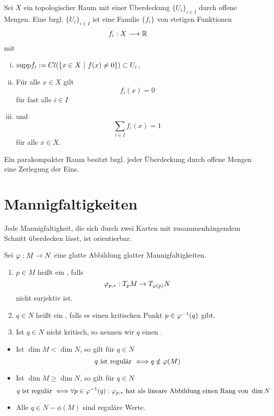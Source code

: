 \Def{}
Sei $X$ ein topologischer Raum mit einer Überdeckung $\{U_i\}_{i\in I}$ durch offene Mengen. Eine  bzgl. $\{U_i\}_{i\in I}$ ist eine Familie $\{f_i\}_{}$ von stetigen Funktionen
\begin{align*}
f_i : X & \overset{}{\longrightarrow} \mathbb{R}
\end{align*}
mit
\begin{enumerate}[i.)]
	\item $\supp f_i := Cl(\set{x\in X}{f(x) \neq 0}) \subset U_i$,
	\item Für alle $x \in X$ gilt
	\[ f_i(x) = 0 \]
	für fast alle $i \in I$
	\item und
	\[\sum_{i\in I}f_i(x) = 1\]
	für alle $x \in X$.
\end{enumerate}

\Satz{}
Ein parakompakter Raum besitzt bzgl. jeder Überdeckung durch offene Mengen eine Zerlegung der Eins.

\section{Mannigfaltigkeiten}
Jede Mannigfaltigkeit, die sich durch zwei Karten mit zusammenhängendem Schnitt überdecken lässt, ist orientierbar.


\Def{}
Sei $\varphi : M \overset{}{\rightarrow} N$ eine glatte Abbildung glatter Mannigfaltigkeiten.
\begin{enumerate}[1.)]
	\item $p \in M$ heißt ein , falls
	\[\varphi_{p,*} : T_pM \overset{}{\rightarrow} T_{\varphi(p)}N\]
	nicht surjektiv ist.
	\item $q \in N$ heißt ein , falls es einen kritischen Punkt $p\in \varphi^{-1}(q)$ gibt.
	\item Ist $q \in N$ nicht kritisch, so nennen wir $q$ einen . 
\end{enumerate}
\Bem{}
\begin{itemize}
	\item Ist $\dim M < \dim N$, so gilt für $q \in N$
	\[q \text{ ist regulär } \overset{}{\Longleftrightarrow} q \notin \varphi(M) \]
	\item Ist $\dim M \geq \dim N$, so gilt für $q \in N$
	\[ q \text{ ist regulär } \overset{}{\Longleftrightarrow} \forall p \in \varphi^{-1}(q): \varphi_{p,*} \text{ hat als lineare Abbildung einen Rang von } \dim N \]
	\item Alle $q\in N - \phi(M)$ sind reguläre Werte.
\end{itemize}

